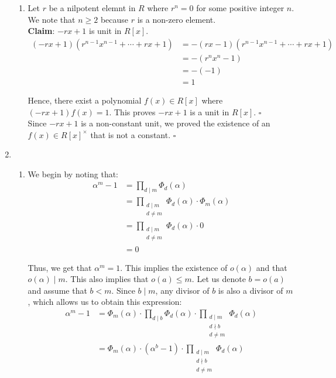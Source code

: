 \documentclass{article}
\begin{document}
\begin{enumerate}
\begin{enumerate}
    \item 
    Let $r$ be a nilpotent elemnt in $R$ where $r^n = 0$ for some positive integer $n$. We note that $n \geq 2$ because $r$ is a non-zero element. \\

    \textbf{Claim}: $-rx + 1$ is unit in $R[x]$. \\

    \begin{align*}
        (-rx + 1)(r^{n-1}x^{n-1} + \cdots + rx + 1) &= -(rx - 1)(r^{n-1}x^{n-1} + \cdots + rx + 1) \\
        &= -(r^nx^n - 1)\\
        &= -(-1)\\
        &= 1
    \end{align*}

    Hence, there exist a polynomial $f(x) \in R[x]$ where $(-rx + 1)f(x) = 1$. This proves $-rx + 1$ is a unit in $R[x]$. \hfill $\square$ \\

    Since $-rx + 1$ is a non-constant unit, we proved the existence of an $f(x) \in R[x]^{\times}$ that is not a constant. \hfill $\square$
\end{enumerate}

\newpage
\item
\begin{enumerate}
    \item 
    We begin by noting that: 
    \begin{align*}
        \alpha^m - 1 &= \prod_{d \mid m} \Phi_d(\alpha) \\
        &= \prod_{\substack{d \mid m \\ d \neq m}} \Phi_d(\alpha) \cdot \Phi_m(\alpha) \\ 
        &= \prod_{\substack{d \mid m \\ d \neq m}} \Phi_d(\alpha) \cdot 0 \\
        &= 0
    \end{align*}

    Thus, we get that $\alpha^m = 1$. This implies the existence of $o(\alpha)$ and that $o(\alpha) \mid m$. This also implies that $o(a) \leq m$. Let us denote $b = o(a)$ and assume that $b < m$. Since $b \mid m$, any divisor of $b$ is also a divisor of $m$, which allows us to obtain this expression: 
    \begin{align*}
        \alpha^m - 1 &= \Phi_m(\alpha) \cdot \prod_{d \mid b} \Phi_d(\alpha) \cdot \prod_{\substack{d \mid m \\ d \nmid b \\ d \neq m}} \Phi_d(\alpha)\\
        &= \Phi_m(\alpha) \cdot(\alpha^b - 1) \cdot \prod_{\substack{d \mid m \\ d \nmid b \\ d \neq m}} \Phi_d(\alpha)
    \end{align*}


\end{enumerate}
\end{enumerate}
\end{document}
